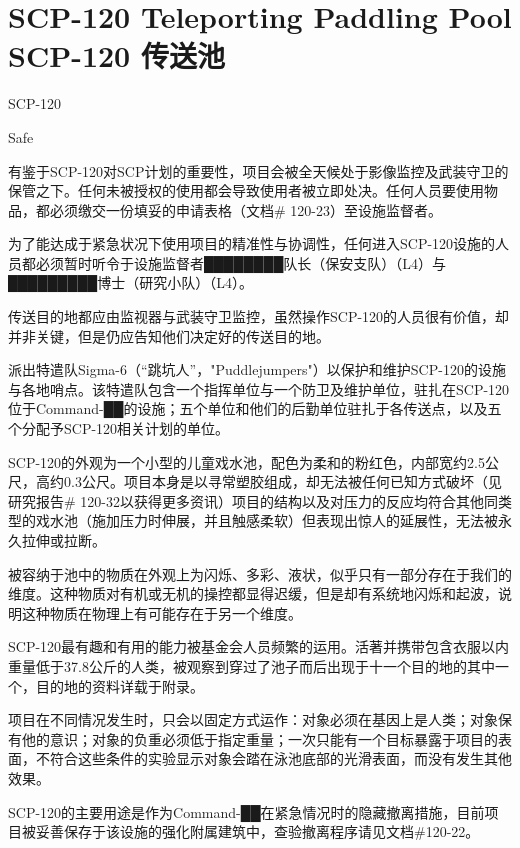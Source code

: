 \chapter[SCP-120 传送池]{
    SCP-120 Teleporting Paddling Pool\\
    SCP-120 传送池
}

\label{chap:SCP-120}

SCP-120

Safe

有鉴于SCP-120对SCP计划的重要性，项目会被全天候处于影像监控及武装守卫的保管之下。任何未被授权的使用都会导致使用者被立即处决。任何人员要使用物品，都必须缴交一份填妥的申请表格（文档\# 120-23）至设施监督者。

为了能达成于紧急状况下使用项目的精准性与协调性，任何进入SCP-120设施的人员都必须暂时听令于设施监督者████████队长（保安支队）（L4）与█████████博士（研究小队）（L4）。

传送目的地都应由监视器与武装守卫监控，虽然操作SCP-120的人员很有价值，却并非关键，但是仍应告知他们决定好的传送目的地。

派出特遣队Sigma-6（“跳坑人”，"Puddlejumpers"）以保护和维护SCP-120的设施与各地哨点。该特遣队包含一个指挥单位与一个防卫及维护单位，驻扎在SCP-120位于Command-██的设施；五个单位和他们的后勤单位驻扎于各传送点，以及五个分配予SCP-120相关计划的单位。

SCP-120的外观为一个小型的儿童戏水池，配色为柔和的粉红色，内部宽约2.5公尺，高约0.3公尺。项目本身是以寻常塑胶组成，却无法被任何已知方式破坏（见研究报告\# 120-32以获得更多资讯）项目的结构以及对压力的反应均符合其他同类型的戏水池（施加压力时伸展，并且触感柔软）但表现出惊人的延展性，无法被永久拉伸或拉断。

被容纳于池中的物质在外观上为闪烁、多彩、液状，似乎只有一部分存在于我们的维度。这种物质对有机或无机的操控都显得迟缓，但是却有系统地闪烁和起波，说明这种物质在物理上有可能存在于另一个维度。

SCP-120最有趣和有用的能力被基金会人员频繁的运用。活著并携带包含衣服以内重量低于37.8公斤的人类，被观察到穿过了池子而后出现于十一个目的地的其中一个，目的地的资料详载于附录。

项目在不同情况发生时，只会以固定方式运作：对象必须在基因上是人类；对象保有他的意识；对象的负重必须低于指定重量；一次只能有一个目标暴露于项目的表面，不符合这些条件的实验显示对象会踏在泳池底部的光滑表面，而没有发生其他效果。

SCP-120的主要用途是作为Command-██在紧急情况时的隐藏撤离措施，目前项目被妥善保存于该设施的强化附属建筑中，查验撤离程序请见文档\#120-22。

